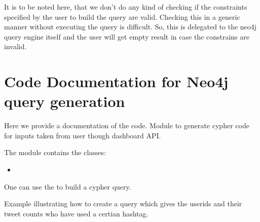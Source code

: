 \documentclass[letterpaper,10pt,english]{sphinxmanual}
\begin{document}
It is to be noted here, that we don’t do any kind of checking if the constraints specified by the user to build the query are valid. Checking this in a generic manner without executing the query is difficult. So, this is delegated to the neo4j query engine itself and the user will get empty result in case the constrains are invalid.


\section{Code Documentation for Neo4j query generation}
\label{\detokenize{neo4j_query_generation:code-documentation-for-neo4j-query-generation}}
Here we provide a documentation of the code.
\label{\detokenize{neo4j_query_generation:module-generate_queries}}
Module to generate cypher code for inputs taken from user though dashboard API.

The {\hyperref[\detokenize{neo4j_query_generation:module-generate_queries}]{}} module contains the classes:
\begin{itemize}
\item {} 
{\hyperref[\detokenize{neo4j_query_generation:generate_queries.CreateQuery}]{}}

\end{itemize}

One can use the {\hyperref[\detokenize{neo4j_query_generation:generate_queries.CreateQuery.create_query}]{}} to build a cypher query.

Example illustrating how to create a query which gives the userids and their tweet counts who have used a certian hashtag.
\end{document}
